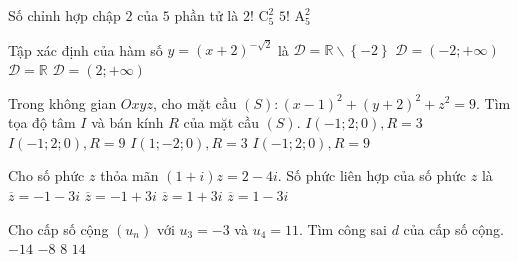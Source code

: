 \begin{ex}%
	Số chỉnh hợp chập $2$ của $5$ phần tử là
	\choice
	{$2!$}
	{$\mathrm{C}_5^2$}
	{$5!$}
	{\True $\mathrm{A}_5^2$}
\end{ex}
\begin{ex}%
	Tập xác định của hàm số $y=\left( x+2 \right)^{-\sqrt{2}}$ là
	\choice
	{$\mathscr{D}=\mathbb{R}\backslash \left\{ -2 \right\}$}
	{\True $\mathscr{D}=\left( -2;+\infty \right)$}
	{$\mathscr{D}=\mathbb{R}$}
	{$\mathscr{D}=\left( 2;+\infty \right)$}
\end{ex}
\begin{ex}%
	Trong không gian $Oxyz$, cho mặt cầu $\left( S \right) \colon \left( x-1 \right)^2+\left( y+2 \right)^2+z^2=9$. Tìm tọa độ tâm $I$ và bán kính $R$ của mặt cầu $\left( S \right)$.
	\choice
	{$I\left( -1;2;0 \right), R=3$}
	{$I\left( -1;2;0 \right), R=9$}
	{\True $I\left( 1;-2;0 \right), R=3$}
	{$I\left( -1;2;0 \right), R=9$}
\end{ex}
\begin{ex}%
	Cho số phức $z$ thỏa mãn $\left( 1+i \right)z=2-4i$. Số phức liên hợp của số phức $z$ là
	\choice
	{$\overline{z}=-1-3i$}
	{\True $\overline{z}=-1+3i$}
	{$\overline{z}=1+3i$}
	{$\overline{z}=1-3i$}
\end{ex}
\begin{ex}%
	Cho cấp số cộng $\left( u_n \right)$ với $u_3=-3$ và $u_4=11$. Tìm công sai $d$ của cấp số cộng.
	\choice
	{$-14$}
	{$-8$}
	{$8$}
	{\True $14$}
\end{ex}
